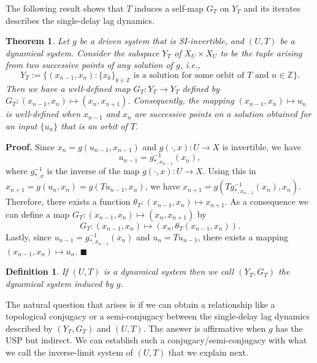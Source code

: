 \documentclass[12 pt]{article}
\newtheorem{Definition}{Definition}[]
\newtheorem{Theorem}{Theorem}[]
\begin{document}
The following result shows that $T$ induces a self-map $G_T$ on $Y_T$ and its iterates describes the single-delay lag dynamics.

\begin{Theorem} \label{Thm_GT_Exists}
Let $g$ be a driven system that is SI-invertible, and $(U,T)$ be a dynamical system. Consider the subspace $Y_T$ of $X_U \times X_U$ to be the tuple arising from two successive points of any solution of $g$, i.e.,
$$Y_T:=\{(x_{n-1},x_n): \{x_k\}_{k\in \mathbb{Z}} \mbox{ is a solution for some orbit of } T \mbox{ and } n \in \mathbb{Z}\}.$$ Then we have a well-defined map $G_T: Y_T \to Y_T$ defined by $G_T : (x_{n-1},x_n) \mapsto (x_n,x_{n+1})$. Consequently, the mapping $(x_{n-1},x_n) \mapsto u_{n}$ is well-defined when $x_{n-1}$ and $x_n$ are successive points on a solution obtained for an input 
$\{u_n\}$ that is an orbit of $T$.
\end{Theorem}

{\bf Proof.} Since $x_n=g(u_{n-1},x_{n-1})$ and $g(\cdot,x):U \to X$ is invertible, we have 
\begin{equation}
u_{n-1} = g_{*,x_{n-1}}^{-1}(x_n),
\end{equation}
where  $g_{*,x}^{-1}$ is the inverse of the map $g(\cdot,x):U \to X$. Using this in $x_{n+1}=g(u_n,x_n)=g(Tu_{n-1},x_n)$, we have $x_{n+1}=g(Tg_{*,x_{n-1}}^{-1}(x_n),x_n)$. Therefore, there exists a function $\theta_T: (x_{n-1},x_n) \mapsto x_{n+1}$. As a consequence we can define a map $G_T : (x_{n-1},x_n) \mapsto 
(x_n,x_{n+1})$ by 
\begin{equation} \label{eqn_GT}
	G_T: (x_{n-1},x_n) \mapsto 
(x_n,\theta_T(x_{n-1},x_n)). 
\end{equation}
Lastly, since $u_{n-1} = g_{*,x_{n-1}}^{-1}(x_n)$ and $u_{n} = Tu_{n-1}$, there exists a mapping $(x_{n-1},x_{n}) \mapsto u_n$.
$\blacksquare$


\begin{Definition} \rm
	If $(U,T)$ is a dynamical system then we call $(Y_T,G_T)$ the dynamical system induced by $g$. 
\end{Definition}



The natural question that arises is if we can obtain a relationship like a topological conjugacy or a semi-conjugacy between the single-delay lag dynamics described by $(Y_T, G_T)$ and $(U,T)$. The answer is affirmative when $g$ has the USP but indirect. We can establish such a conjugacy/semi-conjugacy with what we call the inverse-limit system of $(U,T)$ that we explain next.
\end{document}
